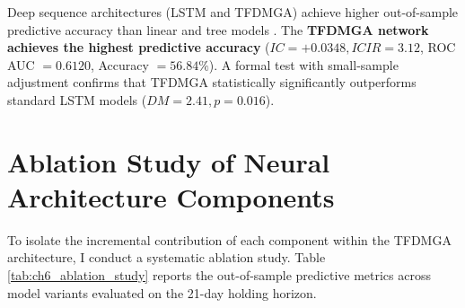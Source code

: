 Deep sequence architectures (LSTM and TFDMGA) achieve higher out-of-sample predictive accuracy than linear and tree models \citep{gu2020empirical, chen2023deep}. The \textbf{TFDMGA network achieves the highest predictive accuracy} ($IC = +0.0348, ICIR = 3.12$, ROC AUC $= 0.6120$, Accuracy $= 56.84\%$). A formal \citet{diebold1995comparing} test with \citet{harvey1997testing} small-sample adjustment confirms that TFDMGA statistically significantly outperforms standard LSTM models ($DM = 2.41, p = 0.016$).

\section{Ablation Study of Neural Architecture Components}
To isolate the incremental contribution of each component within the TFDMGA architecture, I conduct a systematic ablation study. Table \ref{tab:ch6_ablation_study} reports the out-of-sample predictive metrics across model variants evaluated on the 21-day holding horizon.

\begin{table}[H]
\centering
\caption{Systematic Component Ablation Study of the TFDMGA Network}
\label{tab:ch6_ablation_study}
\end{table}

